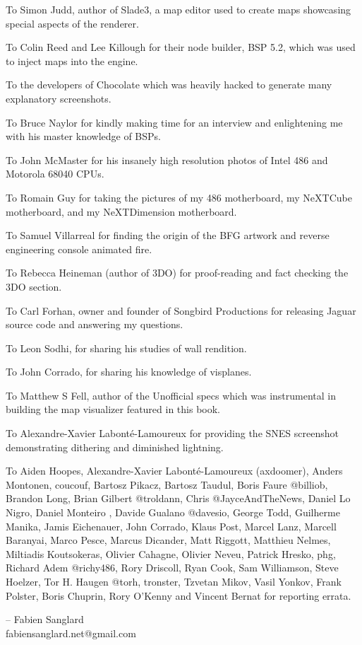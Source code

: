 \par
To Simon Judd, author of Slade3, a map editor used to create maps showcasing special aspects of the renderer.\\
\par
To Colin Reed and Lee Killough for their node builder, BSP 5.2, which was used to inject maps into the \doom{} engine.\\
\par
To the developers of Chocolate \doom{} which was heavily hacked to generate many explanatory screenshots.\\
\par
To Bruce Naylor for kindly making time for an interview and enlightening me with his master knowledge of BSPs.\\
\par
To John McMaster for his insanely high resolution photos of Intel 486 and Motorola 68040 CPUs.\\
\par
To Romain Guy for taking the pictures of my 486 motherboard, my NeXTCube motherboard, and my NeXTDimension motherboard.\\
\par
To Samuel Villarreal for finding the origin of the BFG artwork and reverse engineering \doom{} console animated fire.\\
\par
To Rebecca Heineman (author of \doom{} 3DO) for proof-reading and fact checking the 3DO section.\\
\par
To Carl Forhan, owner and founder of Songbird Productions for releasing \doom{} Jaguar source code and answering my questions.\\
\par
To Leon Sodhi, for sharing his studies of \doom{} wall rendition.\\
\par
To John Corrado, for sharing his knowledge of visplanes.\\
\par
To Matthew S Fell, author of the Unofficial \doom{} specs which was instrumental in building the map visualizer featured in this book.\\
\par
To Alexandre-Xavier Labont\'{e}-Lamoureux for providing the SNES screenshot demonstrating dithering and diminished lightning.\\
\par
To Aiden Hoopes, Alexandre-Xavier Labont\'{e}-Lamoureux (axdoomer), Anders Montonen, coucouf, Bartosz Pikacz, Bartosz Taudul, Boris Faure @billiob, Brandon Long, Brian Gilbert @troldann, Chris @JayceAndTheNews, Daniel Lo Nigro, Daniel Monteiro , Davide Gualano @davesio, George Todd, Guilherme Manika, Jamis Eichenauer, John Corrado, Klaus Post, Marcel Lanz, Marcell Baranyai, Marco Pesce, Marcus Dicander, Matt Riggott, Matthieu Nelmes, Miltiadis Koutsokeras, Olivier Cahagne, Olivier Neveu, Patrick Hresko, phg, Richard Adem @richy486, Rory Driscoll, Ryan Cook, Sam Williamson, Steve Hoelzer, Tor H. Haugen @torh, tronster, Tzvetan Mikov, Vasil Yonkov, Frank Polster, Boris Chuprin, Rory O'Kenny and Vincent Bernat for reporting errata.\\
\par
-- Fabien Sanglard\\
fabiensanglard.net@gmail.com
